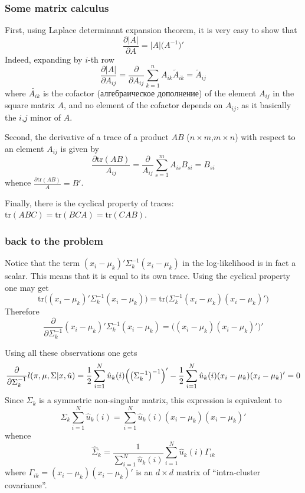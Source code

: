 \documentclass[a4paper]{article}
\newcommand{\tr}{\text{tr}}
\newcommand{\rus}[1]{\foreignlanguage{russian}{#1}}
\begin{document}

\subsubsection*{Some matrix calculus} %
\label{ssub:some_matrix_calculus}

First, using Laplace determinant expansion theorem, it is very easy to show that
\[\frac{\partial \lvert A\rvert}{\partial A} = \lvert A\rvert \bigl(A^{-1}\bigr)'\]
Indeed, expanding by $i$-th row
\[
\frac{\partial \lvert A\rvert}{\partial A_{ij}}
= \frac{\partial }{\partial A_{ij}} \sum_{k=1}^n A_{ik} \tilde{A}_{ik}
= \tilde{A}_{ij}
\]
where $\tilde{A_{ik}}$ is the cofactor (\rus{алгебраическое дополнение}) of
the element $A_{ij}$ in the square matrix $A$, and no element of the cofactor
depends on $A_{ij}$, as it basically the $i$,$j$ minor of $A$.

Second, the derivative of a trace of a product $AB$ ($n\times m$,$m\times n$)
with respect to an element $A_{ij}$ is given by
\[
\frac{\partial \tr(AB)}{A_{ij}}
= \frac{\partial }{A_{ij}} \sum_{s=1}^m A_{is} B_{si}
= B_{si}
\]
whence $\frac{\partial \tr(AB)}{A} = B'$.

Finally, there is the cyclical property of traces: $\tr(ABC) = \tr(BCA) = \tr(CAB)$.


\subsubsection*{back to the problem} %
\label{ssub:back_to_the_problem}
Notice that the term $(x_i-\mu_k)' \Sigma_k^{-1} (x_i-\mu_k)$ in the log-likelihood
is in fact a scalar. This means that it is equal to its own trace. Using the cyclical
property one may get
\[
\tr \bigl((x_i-\mu_k)' \Sigma_k^{-1} (x_i-\mu_k)\bigr)
= \tr \bigl(\Sigma_k^{-1} (x_i-\mu_k) (x_i-\mu_k)'\bigr)
\]
Therefore
\[
\frac{\partial }{\partial \Sigma_k^{-1}} (x_i-\mu_k)' \Sigma_k^{-1} (x_i-\mu_k)
= \bigl((x_i-\mu_k) (x_i-\mu_k)'\bigr)'
\]

Using all these observations one gets
\[
\frac{\partial }{\partial \Sigma_k^{-1}} l(\pi, \mu, \Sigma\lvert x, \hat{u})
= \frac{1}{2} \sum_{i=1}^N \hat{u}_k(i) \Bigl(\bigl(\Sigma_k^{-1}\bigr)^{-1}\Bigr)'
- \frac{1}{2} \sum_{i=1}^N \hat{u}_k(i) (x_i-\mu_k) (x_i-\mu_k)' = 0
\]
Since $\Sigma_k$ is a symmetric non-singular matrix, this expression is equivalent to
\[
\Sigma_k \sum_{i=1}^N \hat{u}_k(i) = \sum_{i=1}^N \hat{u}_k(i) (x_i-\mu_k) (x_i-\mu_k)'
\]
whence
\[
\hat{\Sigma}_k = \frac{1}{\sum_{i=1}^N \hat{u}_k(i)} \sum_{i=1}^N \hat{u}_k(i) \Gamma_{ik}
\]
where $\Gamma_{ik} = (x_i-\mu_k) (x_i-\mu_k)'$ is an $d\times d$ matrix of
``intra-cluster covariance''.
\end{document}

